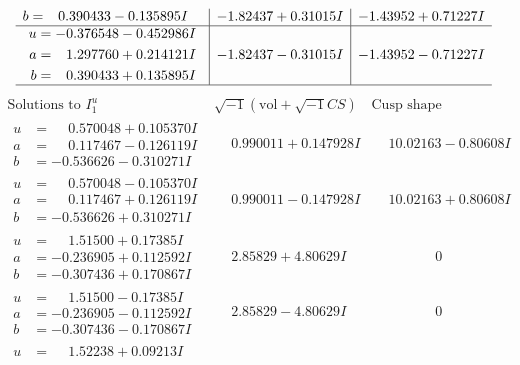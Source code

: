 \documentclass[1p]{elsarticle_modified}
\theoremstyle{definition}
\newcommand{\I}{\sqrt{-1}}
\begin{document}
$$\begin{array}{c|c|c}
\begin{aligned}
b &= \phantom{-}0.390433 - 0.135895 I\end{aligned}
 & -1.82437 + 0.31015 I & -1.43952 + 0.71227 I \\ \hline\begin{aligned}
u &= -0.376548 - 0.452986 I \\
a &= \phantom{-}1.297760 + 0.214121 I \\
b &= \phantom{-}0.390433 + 0.135895 I\end{aligned}
 & -1.82437 - 0.31015 I & -1.43952 - 0.71227 I\\
 \hline 
 \end{array}$$\newpage$$\begin{array}{c|c|c}  
\text{Solutions to }I^u_{1}& \I (\text{vol} + \sqrt{-1}CS) & \text{Cusp shape}\\
 \hline 
\begin{aligned}
u &= \phantom{-}0.570048 + 0.105370 I \\
a &= \phantom{-}0.117467 - 0.126119 I \\
b &= -0.536626 - 0.310271 I\end{aligned}
 & \phantom{-}0.990011 + 0.147928 I & \phantom{-}10.02163 - 0.80608 I \\ \hline\begin{aligned}
u &= \phantom{-}0.570048 - 0.105370 I \\
a &= \phantom{-}0.117467 + 0.126119 I \\
b &= -0.536626 + 0.310271 I\end{aligned}
 & \phantom{-}0.990011 - 0.147928 I & \phantom{-}10.02163 + 0.80608 I \\ \hline\begin{aligned}
u &= \phantom{-}1.51500 + 0.17385 I \\
a &= -0.236905 + 0.112592 I \\
b &= -0.307436 + 0.170867 I\end{aligned}
 & \phantom{-}2.85829 + 4.80629 I & \phantom{-0.000000 } 0 \\ \hline\begin{aligned}
u &= \phantom{-}1.51500 - 0.17385 I \\
a &= -0.236905 - 0.112592 I \\
b &= -0.307436 - 0.170867 I\end{aligned}
 & \phantom{-}2.85829 - 4.80629 I & \phantom{-0.000000 } 0 \\ \hline\begin{aligned}
u &= \phantom{-}1.52238 + 0.09213 I \\

\end{aligned}
\end{array}$$
\end{document}
